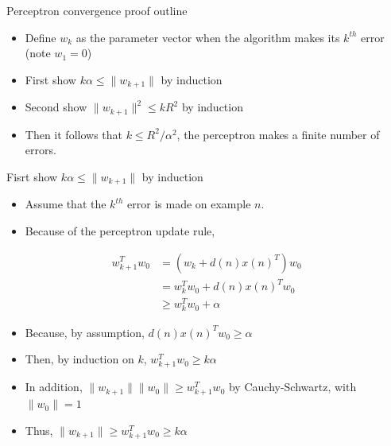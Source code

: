 \documentclass[notes]{beamer}
\providecommand{\tightlist}{%
  \setlength{\itemsep}{0pt}\setlength{\parskip}{0pt}}
\begin{document}
\begin{frame}{Perceptron convergence proof outline}

\begin{itemize}
\tightlist
\item
  Define \(w_k\) as the parameter vector when the algorithm makes its
  \(k^{th}\) error (note \(w_1=0\))
\item
  First show \(k\alpha \le \|w_{k+1}\|\) by induction
\item
  Second show \(\|w_{k+1}\|^2\le k R^2\) by induction
\item
  Then it follows that \(k\le R^2/\alpha^2\), \ie the perceptron makes a
  finite number of errors.
\end{itemize}

\end{frame}

\begin{frame}{Fisrt show \(k\alpha \le \|w_{k+1}\|\) by induction}

\begin{itemize}
\tightlist
\item
  Assume that the \(k^{th}\) error is made on example \(n\).
\item
  Because of the perceptron update rule,
\end{itemize}

\begin{equation} 
\begin{aligned} 
w_{k+1}^T w_0 & = (w_k+d(n)x(n)^T) w_0 \\  
&=  w_k^Tw_0+d(n) x(n)^T w_0  \\
&\ge w_k^T w_0 + \alpha
\end{aligned}
\end{equation}

\begin{itemize}
\tightlist
\item
  Because, by assumption, \(d(n)x(n)^T w_0 \ge \alpha\)
\item
  Then, by induction on \(k\), \(w_{k+1}^T w_0 \ge k \alpha\)
\item
  In addition, \(\|w_{k+1} \| \|w_0\| \ge w^T_{k+1} w_0\) by
  Cauchy-Schwartz, with \(\|w_0\|=1\)
\item
  Thus, \(\|w_{k+1}\| \ge w_{k+1}^Tw_0 \ge k \alpha\)
\end{itemize}

\end{frame}
\end{document}

